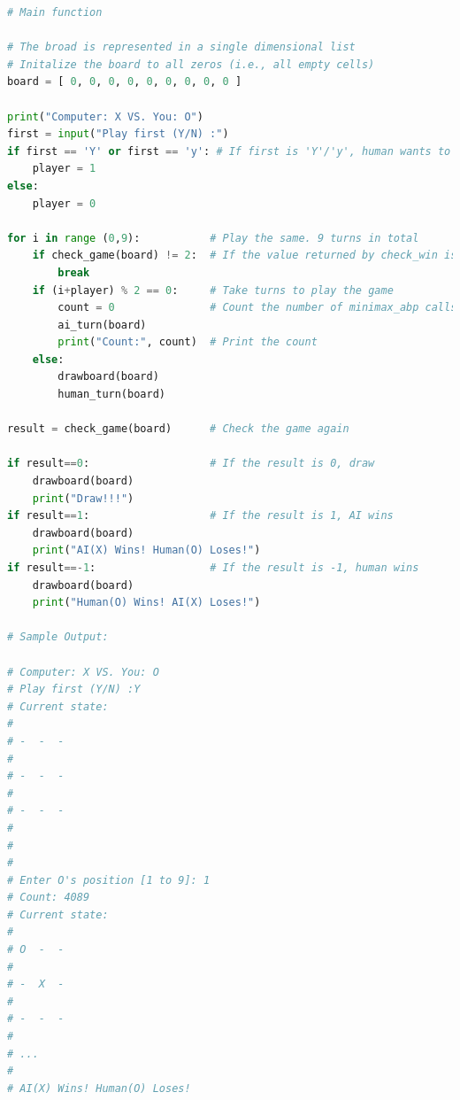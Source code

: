 \documentclass{book}
\begin{document}
\newpage
\begin{lstlisting}[language=Python, basicstyle=\ttfamily\small, keywordstyle=\color{blue}, commentstyle=\color{forestgreen}, stringstyle=\color{red}, showstringspaces=false]
# Main function

# The broad is represented in a single dimensional list
# Initalize the board to all zeros (i.e., all empty cells)
board = [ 0, 0, 0, 0, 0, 0, 0, 0, 0 ]

print("Computer: X VS. You: O")
first = input("Play first (Y/N) :")
if first == 'Y' or first == 'y': # If first is 'Y'/'y', human wants to play first
    player = 1
else:
    player = 0

for i in range (0,9):           # Play the same. 9 turns in total
    if check_game(board) != 2:  # If the value returned by check_win is not 2, the game is finished
        break
    if (i+player) % 2 == 0:     # Take turns to play the game
        count = 0               # Count the number of minimax_abp calls
        ai_turn(board)
        print("Count:", count)  # Print the count
    else:
        drawboard(board)
        human_turn(board)

result = check_game(board)      # Check the game again

if result==0:                   # If the result is 0, draw
    drawboard(board)
    print("Draw!!!")
if result==1:                   # If the result is 1, AI wins
    drawboard(board)
    print("AI(X) Wins! Human(O) Loses!")
if result==-1:                  # If the result is -1, human wins
    drawboard(board)
    print("Human(O) Wins! AI(X) Loses!")

# Sample Output:

# Computer: X VS. You: O
# Play first (Y/N) :Y
# Current state:
#
# -  -  -
#
# -  -  -
#
# -  -  -
#
#
#
# Enter O's position [1 to 9]: 1
# Count: 4089
# Current state:
#
# O  -  -
#
# -  X  -
#
# -  -  -
#
# ...
#
# AI(X) Wins! Human(O) Loses!
\end{lstlisting}
\newpage
\end{document}

